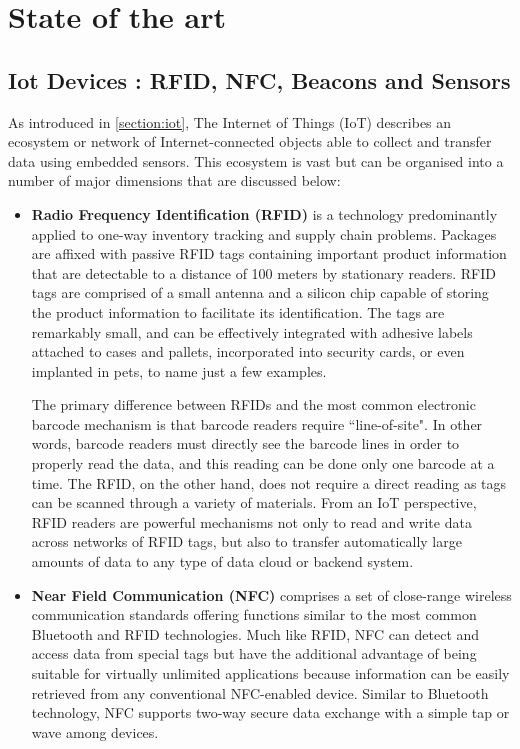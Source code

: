 \chead{}
\chapter{State of the art}

\section{Iot Devices : RFID, NFC, Beacons and Sensors}

As introduced in \ref{section:iot}, The Internet of Things (IoT) describes an ecosystem or network of Internet-connected objects able to collect and transfer data using embedded sensors. This ecosystem is vast but can be organised into a number of major dimensions that are discussed below: 

\begin{itemize}
  \item \textbf{Radio Frequency Identification (RFID) } is a technology predominantly applied to one-way inventory tracking and supply chain problems. Packages are affixed with passive RFID tags containing important product information that are detectable to a distance of 100 meters by stationary readers. RFID tags are comprised of a small antenna and a silicon chip capable of storing the product information to facilitate its identification. The tags are remarkably small, and can be effectively integrated with adhesive labels attached to cases and pallets, incorporated into security cards, or even implanted in pets, to name just a few examples.
  
  The primary difference between RFIDs and the most common electronic barcode mechanism is that barcode readers require ``line-of-site". In other words, barcode readers must directly see the barcode lines in order to properly read the data, and this reading can be done only one barcode at a time. The RFID, on the other hand, does not require a direct reading as
tags can be scanned through a variety of materials. From an IoT perspective, RFID readers are powerful mechanisms not only to read and write data across networks of RFID tags, but also to transfer automatically large amounts of data to any type of data cloud or backend system.

  \item \textbf{Near Field Communication (NFC) } comprises a set of close-range wireless communication standards offering functions similar to the most common Bluetooth and RFID technologies. Much like RFID, NFC can detect and access data from special tags but have the additional advantage of being suitable for virtually unlimited applications because information can be easily retrieved from any conventional NFC-enabled device. Similar to Bluetooth technology, NFC supports two-way secure data exchange with a simple tap or wave among devices.
  

\end{itemize}
